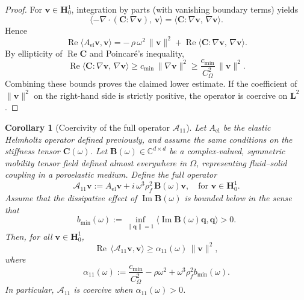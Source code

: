 \documentclass[pdflatex,sn-mathphys-num]{sn-jnl}
\theoremstyle{thmstyleone}%
\theoremstyle{thmstyletwo}%
\theoremstyle{thmstylethree}%
\def \calA {\mathcal{A}}
\newtheorem{corollary}[theorem]{Corollary}
\theoremstyle{definition}
\begin{document}
	\begin{proof}
		For $\mathbf{v} \in \bm{H}_{0}^{1}$, integration by parts (with vanishing boundary terms) yields
		\[
		\langle -\nabla\!\cdot(\mathbf{C}:\nabla\mathbf{v}),\,\mathbf{v}\rangle 
		= \langle \mathbf{C}:\nabla\mathbf{v},\,\nabla\mathbf{v}\rangle .
		\]
		Hence
		\[
		\operatorname{Re}\langle A_{\mathrm{el}}\mathbf{v}, \mathbf{v}\rangle 
		= -\,\rho\,\omega^2\,\|\mathbf{v}\|^2
		+ \operatorname{Re}\langle \mathbf{C}:\nabla\mathbf{v},\,\nabla\mathbf{v}\rangle .
		\]
		By ellipticity of $\operatorname{Re}\mathbf{C}$ and Poincaré’s inequality,
		\[
		\operatorname{Re}\langle \mathbf{C}:\nabla\mathbf{v},\,\nabla\mathbf{v}\rangle 
		\ge c_{\min}\,\|\nabla\mathbf{v}\|^2
		\ge \frac{c_{\min}}{C_{\Omega}^2}\,\|\mathbf{v}\|^2.
		\]
		Combining these bounds proves the claimed lower estimate. If the coefficient of $\|\mathbf{v}\|^2$ on the right-hand side is strictly positive, the operator is coercive on $\bm{L}^{2}$.
	\end{proof}
	
	\setcounter{theorem}{0}
	
	
	\begin{corollary}[Coercivity of the full operator $\calA_{11}$]
		Let $A_{\mathrm{el}}$ be the elastic Helmholtz operator defined previously, and assume the same conditions on the stiffness tensor $\mathbf{C}(\omega)$. Let $\mathbf{B}(\omega) \in \mathbb{C}^{d \times d}$ be a complex-valued, symmetric mobility tensor field defined almost everywhere in $\Omega$, representing fluid--solid coupling in a poroelastic medium. Define the full operator
		\begin{equation}
			\calA_{11}\mathbf{v} := A_{\mathrm{el}}\mathbf{v} + i\,\omega^3 \rho_f^2\,\mathbf{B}(\omega)\mathbf{v},
			\quad \text{for } \mathbf{v} \in \bm{H}_{0}^{1}.
			\label{Poroelastic_A11}
		\end{equation}
		Assume that the dissipative effect of $\operatorname{Im}\mathbf{B}(\omega)$ is bounded below in the sense that 
		\begin{equation}
			b_{\min}(\omega) := \inf_{\|\mathbf{q}\|=1} \langle \operatorname{Im}\mathbf{B}(\omega)\mathbf{q}, \mathbf{q}\rangle > 0.
			\label{Poroelastic_A11_Bmin}
		\end{equation}
		Then, for all $\mathbf{v} \in \bm{H}_{0}^{1}$,
		\[
		\operatorname{Re}\,\langle \calA_{11}\mathbf{v}, \mathbf{v}\rangle
		\ge \alpha_{11}(\omega)\,\|\mathbf{v}\|^2,
		\]
		where
		\begin{equation*}
			\alpha_{11}(\omega) := \frac{c_{\min}}{C_{\Omega}^2} - \rho \omega^2 + \omega^3 \rho_f^2 b_{\min}(\omega).
		\end{equation*}
		In particular, $\calA_{11}$ is coercive when $\alpha_{11}(\omega) > 0$.
	\end{corollary}
	
\end{document}
